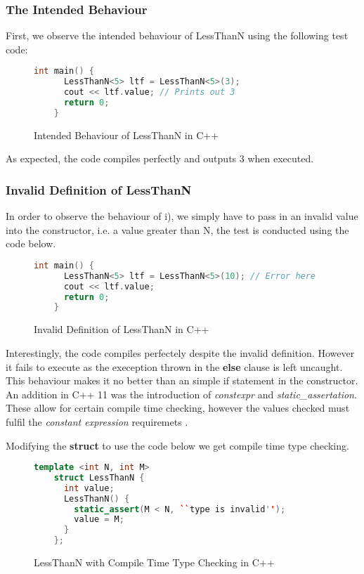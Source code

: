 \documentclass[a4paper,12pt]{report}
\begin{document}
\subsubsection{The Intended Behaviour}
First, we observe the intended behaviour of LessThanN using the following test 
code:
\begin{figure}[H]
  \begin{lstlisting}[language=c++]     
    int main() {
      LessThanN<5> ltf = LessThanN<5>(3);
      cout << ltf.value; // Prints out 3
      return 0;
    }
  \end{lstlisting}
  \caption{Intended Behaviour of LessThanN in C++}
\end{figure}

\par
As expected, the code compiles perfectly and outputs 3 when executed.

\subsubsection{Invalid Definition of LessThanN}
In order to observe the behaviour of i), we simply have to pass in an 
invalid value into the constructor, i.e. a value greater than N, 
the test is conducted using the code below. 

\begin{figure}[H]
  \begin{lstlisting}[language=c++]     
    int main() {
      LessThanN<5> ltf = LessThanN<5>(10); // Error here
      cout << ltf.value; 
      return 0;
    }
  \end{lstlisting}
  \caption{Invalid Definition of LessThanN in C++}
\end{figure}

\par
Interestingly, the code compiles perfectely despite the invalid definition. 
However it fails to execute as the exeception thrown in the \textbf{else} clause 
is left uncaught. This behaviour makes it no better than an simple if statement 
in the constructor. An addition in C++ 11 was the introduction of 
\textit{constexpr} and \textit{static\_assertation}. These allow for certain 
compile time checking, however the values checked must fulfil 
the \textit{constant expression} requiremets \cite{cppConstExpr}. 

\par
Modifying the \textbf{struct} to use the code below we get compile time type 
checking. 

\begin{figure}[H]
  \begin{lstlisting}[language=c++]     
    template <int N, int M>
    struct LessThanN {
      int value;
      LessThanN() {
        static_assert(M < N, ``type is invalid'');
        value = M;
      }
    };
  \end{lstlisting}
  \caption{LessThanN with Compile Time Type Checking in C++}
  \label{code:compileLTN}
\end{figure}
\end{document}
